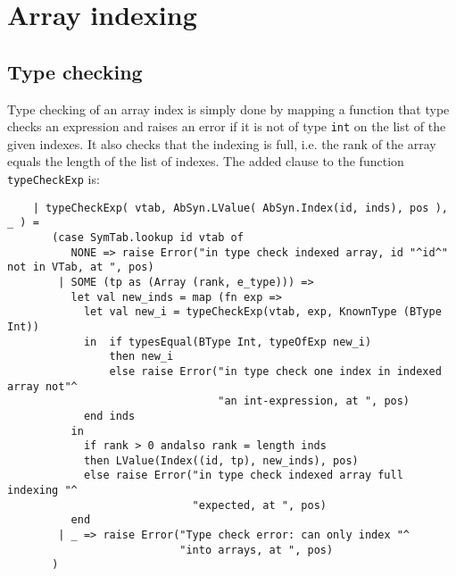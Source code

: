 \documentclass{article}
\begin{document}
\section{Array indexing}
\subsection{Type checking}
Type checking of an array index is simply done by mapping a function that type checks an expression and raises an error if it is not of type \texttt{int} on the list of the given indexes. It also checks that the indexing is full, i.e. the rank of the array equals the length of the list of indexes.
The added clause to the function \texttt{typeCheckExp} is:
\begin{lstlisting}
    | typeCheckExp( vtab, AbSyn.LValue( AbSyn.Index(id, inds), pos ), _ ) =
       (case SymTab.lookup id vtab of
          NONE => raise Error("in type check indexed array, id "^id^" not in VTab, at ", pos)
        | SOME (tp as (Array (rank, e_type))) =>
          let val new_inds = map (fn exp =>
            let val new_i = typeCheckExp(vtab, exp, KnownType (BType Int))
            in  if typesEqual(BType Int, typeOfExp new_i)
                then new_i
                else raise Error("in type check one index in indexed array not"^
                                 "an int-expression, at ", pos)
            end inds
          in
            if rank > 0 andalso rank = length inds
            then LValue(Index((id, tp), new_inds), pos)
            else raise Error("in type check indexed array full indexing "^
                             "expected, at ", pos)
          end
        | _ => raise Error("Type check error: can only index "^
                           "into arrays, at ", pos)
       )
\end{lstlisting}
\end{document}

